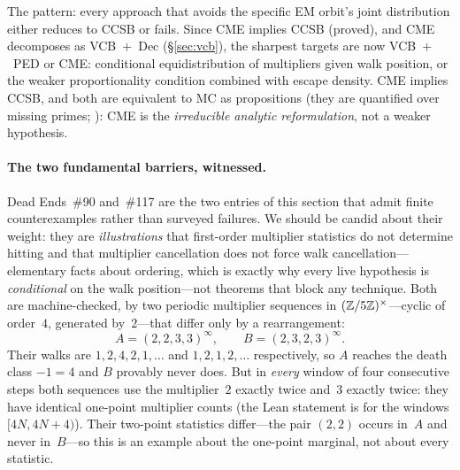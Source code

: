 \smallskip\noindent
The pattern: every approach that avoids the specific EM orbit's
joint distribution either reduces to CCSB or fails.  Since CME
implies CCSB (proved), and CME decomposes as VCB~$+$~Dec
(\S\ref{sec:vcb}), the sharpest targets are now VCB~$+$~PED or CME:
conditional equidistribution of multipliers given walk position, or
the weaker proportionality condition combined with escape density.
CME implies CCSB, and both are equivalent to MC as propositions (they
are quantified over missing primes; ):
CME is the \emph{irreducible analytic reformulation}, not a weaker
hypothesis.


\paragraph{The two fundamental barriers, witnessed.}
\label{sec:barriers-witnessed}
Dead Ends~\#90 and~\#117 are the two entries of this section that admit
finite counterexamples rather than surveyed failures.  We should be
candid about their weight: they are \emph{illustrations} that first-order
multiplier statistics do not determine hitting and that multiplier
cancellation does not force walk cancellation---elementary facts about
ordering, which is exactly why every live hypothesis is
\emph{conditional} on the walk position---not theorems that block any
technique.  Both are machine-checked, by two periodic multiplier
sequences in $(\mathbb{Z}/5\mathbb{Z})^\times$---cyclic of order~$4$, generated
by~$2$---that differ only by a rearrangement:
\[
  A = (2,2,3,3)^\infty,
  \qquad
  B = (2,3,2,3)^\infty .
\]
Their walks are $1,2,4,2,1,\dots$ and $1,2,1,2,\dots$ respectively, so
$A$ reaches the death class $-1 = 4$ and $B$ provably never does.  But
in \emph{every} window of four consecutive steps both sequences use the
multiplier~$2$ exactly twice and~$3$ exactly twice: they have identical
one-point multiplier counts (the Lean statement is for the windows
$[4N, 4N+4)$).  Their two-point statistics differ---the pair $(2,2)$
occurs in~$A$ and never in~$B$---so this is an example about the
one-point marginal, not about every statistic.

